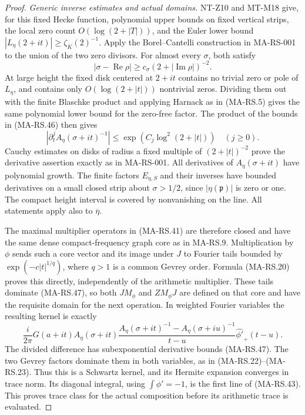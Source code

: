 \begin{proof}
\emph{Generic inverse estimates and actual domains.}
NT-Z10 and MT-M18 give, for this fixed Hecke function, polynomial
upper bounds on fixed vertical strips, the local zero count
$O(\log(2+|T|))$, and the Euler lower bound
$|L_\eta(2+it)|\ge\zeta_K(2)^{-1}$.
Apply the Borel--Cantelli construction in MA-RS-001 to the union
of the two zero divisors. For almost every $\sigma$, both satisfy
\[
 |\sigma-\operatorname{Re}\rho|
                 \ge c_\sigma(2+|\operatorname{Im}\rho|)^{-2}.
 \tag{MA-RS.46}
\]
At large height the fixed disk centered at $2+it$ contains no
trivial zero or pole of $L_\eta$, and contains only
$O(\log(2+|t|))$ nontrivial zeros. Dividing them out with the
finite Blaschke product and applying Harnack as in (MA-RS.5)
gives the same polynomial lower bound for the zero-free factor.
The product of the bounds in (MA-RS.46) then gives
\[
 |\partial_t^j A_\eta(\sigma+it)^{-1}|
       \le \exp(C_j\log^2(2+|t|))\quad(j\ge0).
 \tag{MA-RS.47}
\]
Cauchy estimates on disks of radius a fixed multiple of
$(2+|t|)^{-2}$ prove the derivative assertion exactly as in
MA-RS-001. All derivatives of $A_\eta(\sigma+it)$ have
polynomial growth. The finite factors $E_{\eta,S}$ and their
inverses have bounded derivatives on a small closed strip about
$\sigma>1/2$, since $|\eta(\mathfrak p)|$ is zero or one.
The compact height interval is covered by nonvanishing on the
line. All statements apply also to $\overline\eta$.

The maximal multiplier operators in (MA-RS.41) are therefore
closed and have the same dense compact-frequency graph core as
in MA-RS.9. Multiplication by $\phi$ sends such a core vector
and its image under $J$ to Fourier tails bounded by
$\exp(-c|t|^{1/q})$, where $q>1$ is a common Gevrey order.
Formula (MA-RS.20) proves this directly, independently of the
arithmetic multiplier. These tails dominate (MA-RS.47), so both
$J M_\phi$ and $Z M_\phi J$ are defined on that core and have
the requisite domain for the next operation.
In weighted Fourier variables the resulting kernel is exactly
\[
 \frac{i}{2\pi}G(a+it)A_\eta(\sigma+it)
  \frac{A_\eta(\sigma+it)^{-1}-A_\eta(\sigma+iu)^{-1}}{t-u}
                 \widehat{\phi'}_+(t-u).
 \tag{MA-RS.48}
\]
The divided difference has subexponential derivative bounds
(MA-RS.47). The two Gevrey factors dominate them in both
variables, as in (MA-RS.22)--(MA-RS.23). Thus this is a Schwartz
kernel, and its Hermite expansion converges in trace norm.
Its diagonal integral, using $\int\phi'=-1$, is the first line
of (MA-RS.43). This proves trace class for the actual composition
before its arithmetic trace is evaluated.


\end{proof}
